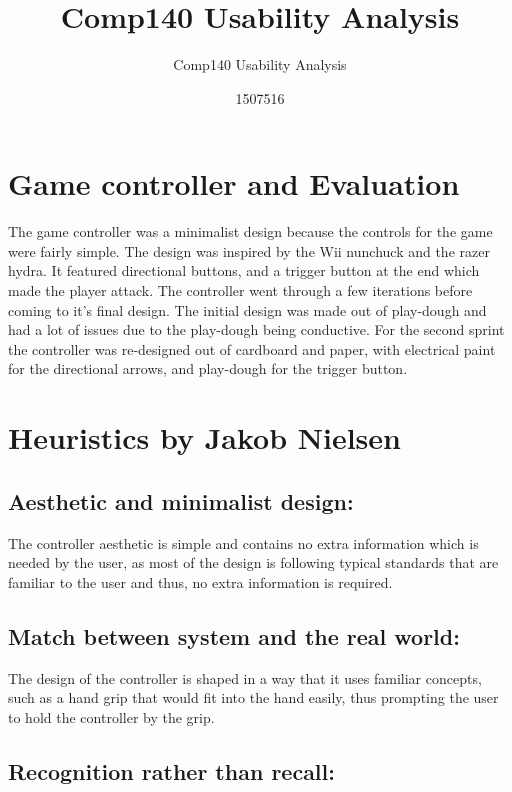 \documentclass{scrartcl}
\title{Comp140 Usability Analysis}
\subtitle{Comp140 Usability Analysis}
\author{1507516}
\begin{document}
\maketitle

\abstract{}

\section{Game controller and Evaluation}

The game controller was a minimalist design because the controls for the game were fairly simple. The design was inspired by the Wii nunchuck and the razer hydra. It featured directional buttons, and a trigger button at the end which made the player attack. The controller went through a few iterations before coming to it's final design. The initial design was made out of play-dough and had a lot of issues due to the play-dough being conductive. For the second sprint the controller was re-designed out of cardboard and paper, with electrical paint for the directional arrows, and play-dough for the trigger button.





\section{Heuristics by Jakob Nielsen\cite{nielsen1990heuristic}}
\subsection{Aesthetic and minimalist design:}

The controller aesthetic is simple and contains no extra information which is needed by the user, as most of the design is following typical standards that are familiar to the user and thus, no extra information is required. 

\subsection{Match between system and the real world:}

The design of the controller is shaped in a way that it uses familiar concepts, such as a hand grip that would fit into the hand easily, thus prompting the user to hold the controller by the grip.

\subsection{Recognition rather than recall:}
\end{document}
